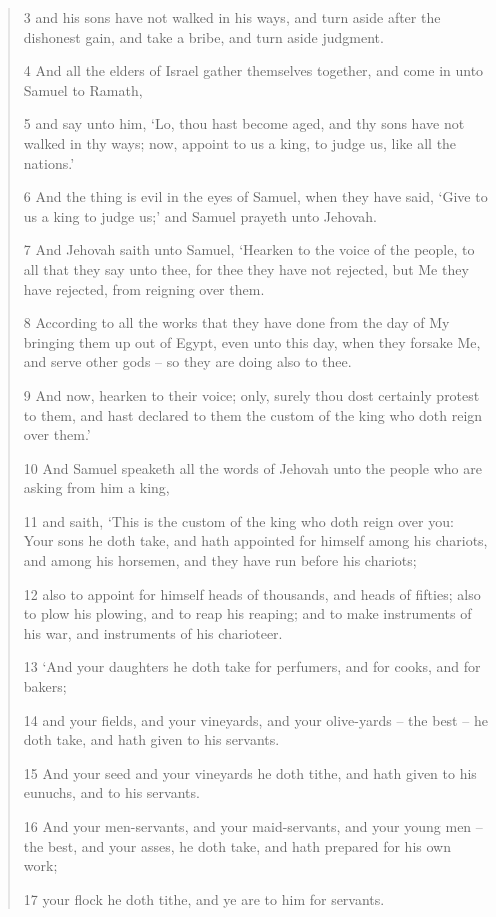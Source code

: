 \documentclass[11pt]{article}
\begin{document}
{\begin{quote}
3 and his sons have not walked in his ways, and turn aside after the dishonest gain, and take a bribe, and turn aside judgment.

4 And all the elders of Israel gather themselves together, and come in unto Samuel to Ramath,

5 and say unto him, `Lo, thou hast become aged, and thy sons have not walked in thy ways; now, appoint to us a king, to judge us, like all the nations.'

6 And the thing is evil in the eyes of Samuel, when they have said, `Give to us a king to judge us;' and Samuel prayeth unto Jehovah.

7 And Jehovah saith unto Samuel, `Hearken to the voice of the people, to all that they say unto thee, for thee they have not rejected, but Me they have rejected, from reigning over them.

8 According to all the works that they have done from the day of My bringing them up out of Egypt, even unto this day, when they forsake Me, and serve other gods -- so they are doing also to thee.

9 And now, hearken to their voice; only, surely thou dost certainly protest to them, and hast declared to them the custom of the king who doth reign over them.'

10 And Samuel speaketh all the words of Jehovah unto the people who are asking from him a king,

11 and saith, `This is the custom of the king who doth reign over you: Your sons he doth take, and hath appointed for himself among his chariots, and among his horsemen, and they have run before his chariots;

12 also to appoint for himself heads of thousands, and heads of fifties; also to plow his plowing, and to reap his reaping; and to make instruments of his war, and instruments of his charioteer.

13 `And your daughters he doth take for perfumers, and for cooks, and for bakers;

14 and your fields, and your vineyards, and your olive-yards -- the best -- he doth take, and hath given to his servants.

15 And your seed and your vineyards he doth tithe, and hath given to his eunuchs, and to his servants.

16 And your men-servants, and your maid-servants, and your young men -- the best, and your asses, he doth take, and hath prepared for his own work;

17 your flock he doth tithe, and ye are to him for servants.


\end{quote}}
\end{document}
